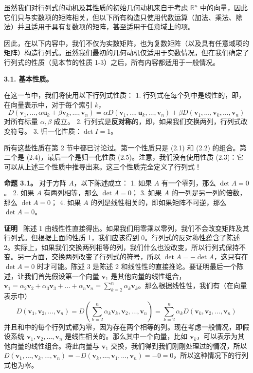 虽然我们对行列式的动机及其性质的初始几何动机来自于考虑 $\mathbb{R}^n$ 中的向量，因此它们只与实数项的矩阵相关，但以下所有构造只使用代数运算（加法、乘法、除法）并且适用于具有复数项的矩阵，甚至适用于任意域上的项。

因此，在以下内容中，我们不仅为实数矩阵，也为复数矩阵（以及具有任意域项的矩阵）构造行列式。虽然我们最初的几何动机仅适用于实数情况，但在我们确定了行列式的性质（见本节的性质 1-3）之后，所有内容都适用于一般情况。

\textbf{3.1. 基本性质。}

在这一节中，我们将使用以下行列式性质：
1. 行列式在每个列中是线性的，即，在向量表示中，对于每个索引 $k$，
$$
D(\mathbf{v}_1, \dots, \alpha \mathbf{u}_k + \beta \mathbf{v}_k, \dots, \mathbf{v}_n) = \alpha D(\mathbf{v}_1, \dots, \mathbf{u}_k, \dots, \mathbf{v}_n) + \beta D(\mathbf{v}_1, \dots, \mathbf{v}_k, \dots, \mathbf{v}_n)
$$
对所有标量 $\alpha, \beta$ 成立。
2. 行列式是\textbf{反对称}的，即，如果我们交换两列，行列式改变符号。
3. 归一化性质：$\det I = 1$。

所有这些性质在第 2 节中都已讨论过。第一个性质只是 (2.1) 和 (2.2) 的组合。第二个是 (2.4)，最后一个是归一化性质 (2.5)。注意，我们没有使用性质 (2.3)：它可以从上述三个性质中推导出来。这三个性质完全定义了行列式！

\textbf{命题 3.1。} 对于方阵 $A$，以下陈述成立：
1. 如果 $A$ 有一个零列，那么 $\det A = 0$。
2. 如果 $A$ 有两列相等，那么 $\det A = 0$；
3. 如果 $A$ 的一列是另一列的倍数，那么 $\det A = 0$；
4. 如果 $A$ 的列是线性相关的，即如果矩阵不可逆，那么 $\det A = 0$。

\textbf{证明}~ 陈述 1 由线性性直接得出。如果我们用零乘以零列，我们不会改变矩阵及其行列式。但根据上面的性质 1，我们应该得到 0。行列式的反对称性蕴含了陈述 2。实际上，如果我们交换两列相等的列，我们什么也没改变，所以行列式保持不变。另一方面，交换两列改变了行列式的符号，所以 $\det A = -\det A$，这只有在 $\det A = 0$ 时才可能。陈述 3 是陈述 2 和线性性的直接推论。要证明最后一个陈述，让我们首先假设第一个向量 $\mathbf{v}_1$ 是其他向量的线性组合，$\mathbf{v}_1 = \alpha_2 \mathbf{v}_2 + \alpha_3 \mathbf{v}_3 + \dots + \alpha_n \mathbf{v}_n = \sum_{k=2}^n \alpha_k \mathbf{v}_k$。那么根据线性性，我们有（在向量表示中）
$$
D(\mathbf{v}_1, \mathbf{v}_2, \dots, \mathbf{v}_n) = D(\sum_{k=2}^n \alpha_k \mathbf{v}_k, \mathbf{v}_2, \dots, \mathbf{v}_n) = \sum_{k=2}^n \alpha_k D(\mathbf{v}_k, \mathbf{v}_2, \dots, \mathbf{v}_n)
$$
并且和中的每个行列式都为零，因为存在两个相等的列。现在考虑一般情况，即假设系统 $\mathbf{v}_1, \mathbf{v}_2, \dots, \mathbf{v}_n$ 是线性相关的。那么其中一个向量，比如 $\mathbf{v}_k$，可以表示为其他向量的线性组合。将此向量与 $\mathbf{v}_1$ 交换，我们得到我们刚刚处理过的情况，所以 $D(\mathbf{v}_1, \dots, \mathbf{v}_k, \dots, \mathbf{v}_n) = -D(\mathbf{v}_k, \dots, \mathbf{v}_1, \dots, \mathbf{v}_n) = -0 = 0$，所以这种情况下的行列式也为零。

